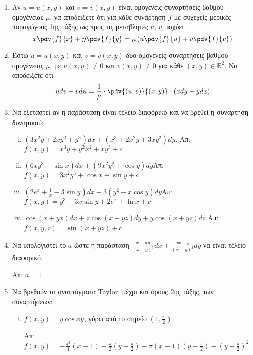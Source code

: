 \begin{enumerate}
 \item Αν $ u = u(x,y) $ και $ v = v(x,y) $ είναι ομογενείς συναρτήσεις βαθμού ομογένειας $\mu$, να
	 αποδείξετε ότι για κάθε συνάρτηση $f$ με συχεχείς μερικές παραγώγους 1ης τάξης ως προς τις
	 μεταβλητές $u$, $v$, ισχύει
	 \[
		 x\pdv{f}{x} + y\pdv{f}{y} = \mu \left(u\pdv{f}{u} + v\pdv{f}{v}\right) 
	 \] 

 \item  Έστω $ u = u(x,y) $ και $ v = v(x,y) $ δύο ομογενείς συναρτήσεις βαθμού ομογένειας $\mu$, με
	 $u(x,y)\neq 0$ και $ v(x,y)\neq 0 $ για κάθε $(x,y) \in \mathbb{R}^{2} $. Να αποδείξετε ότι
	 \[
		 udv - vdu = \frac{ 1 }{ \mu } \cdot \pdv{(u,v)}{(x,y)}\cdot(xdy-ydx) 
	 \] 



\item Να εξεταστεί αν η παράσταση είναι τέλειο διαφορικό και να βρεθεί η συνάρτηση δυναμικού:

\begin{enumerate}[i)]
	\item $ (3x^{2}y+2xy^{2}+y^{3})dx + (x^{3}+2x^{2}y+3xy^{2})dy $. \hfill Απ: $\scriptstyle{
		f(x,y)=x^{3}y+y^{2}x^{2}+xy^{3}+c} $
\item $(6xy^3-\sin x)dx+(9x^2y^2+\cos y)dy$\hfill Απ: $\scriptstyle{f(x,y)=3x^2y^3+\cos x+\sin y+c}$
\item $(2e^{x}+\frac{1}{x}-3\sin y)dx+3(y^2-x\cos y)dy$\hfill Απ: $\scriptstyle{f(x,y)=y^{3}-3x\sin y+2e^{x}+\ln x+c}$
		\item $ \cos{(x+yx)} dx + z \cos{(x+yz)} dy + y \cos{(x+yz)} dz $  \hfill  Απ:
			$\scriptstyle{ f(x,y,z) = \sin{(x+yz)} +c} $.

\end{enumerate}


\item Να υπολογιστεί το $a$ ώστε η παράσταση $ \frac{ x + ay }{ (x-y)^{3} }dx + \frac{ ax+y }{
	(x-y)^{3} }dy $ να είναι τέλειο διαφορικό.

	\hfill Απ: $ a=1 $



\item Να βρεθούν τα αναπτύγματα Taylor, μέχρι και όρους 2ης τάξης, των συναρτήσεων:

\begin{enumerate}[i)]
	\item  $f(x,y)=y\cos{xy} $, γύρω από το σημείο $ \left(1, \frac{ \pi }{ 2 }\right)
		$.

		\hfill Απ: $\scriptstyle{f(x,y)=-\frac{\pi^{2}}{4}(x-1) - \frac{ \pi }{ 2 } \left(y - \frac{
			\pi }{2 }\right) - \pi(x-1)\left(y-\frac{\pi}{2}\right)- \left(y- \frac{ \pi }{ 2}
	\right)^{2}} $


\end{enumerate}
\end{enumerate}
